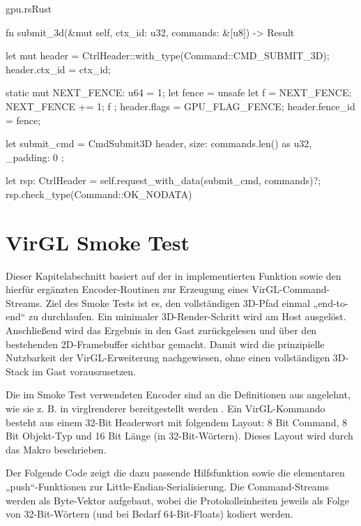\begin{codeblock}{gpu.rs}{Rust}
  \begin{rustcode}
fn submit_3d(&mut self, ctx_id: u32, commands: &[u8]) -> Result {
    let mut header = CtrlHeader::with_type(Command::CMD_SUBMIT_3D);
    header.ctx_id = ctx_id;

    static mut NEXT_FENCE: u64 = 1;
    let fence = unsafe { let f = NEXT_FENCE; NEXT_FENCE += 1; f };
    header.flags = GPU_FLAG_FENCE;
    header.fence_id = fence;

    let submit_cmd = CmdSubmit3D { header, size: commands.len() as u32, _padding: 0 };

    let rsp: CtrlHeader = self.request_with_data(submit_cmd, commands)?;
    rsp.check_type(Command::OK_NODATA)
}
  \end{rustcode}
\end{codeblock}

\section{VirGL Smoke Test}

Dieser Kapitelabschnitt basiert auf der in  implementierten Funktion  sowie den hierfür ergänzten Encoder-Routinen zur Erzeugung eines VirGL-Command-Streams. Ziel des Smoke Tests ist es, den vollständigen 3D-Pfad einmal „end-to-end“ zu durchlaufen. Ein minimaler 3D-Render-Schritt wird am Host ausgelöst. Anschließend wird das Ergebnis in den Gast zurückgelesen und über den bestehenden 2D-Framebuffer sichtbar gemacht. Damit wird die prinzipielle Nutzbarkeit der VirGL-Erweiterung nachgewiesen, ohne einen vollständigen 3D-Stack im Gast vorauszusetzen.

Die im Smoke Test verwendeten Encoder sind an die Definitionen aus  angelehnt, wie sie z. B. in virglrenderer bereitgestellt werden \cite{VirglProtocol}. 
Ein VirGL-Kommando besteht aus einem 32-Bit Headerwort mit folgendem Layout: 8 Bit Command, 8 Bit Objekt-Typ und 16 Bit Länge (in 32-Bit-Wörtern). Dieses Layout wird durch das Makro  beschrieben.

Der Folgende Code zeigt die dazu passende Hilfsfunktion  sowie die elementaren „push“-Funktionen zur Little-Endian-Serialisierung. Die Command-Streams werden als Byte-Vektor aufgebaut, wobei die Protokolleinheiten jeweils als Folge von 32-Bit-Wörtern (und bei Bedarf 64-Bit-Floats) kodiert werden.

